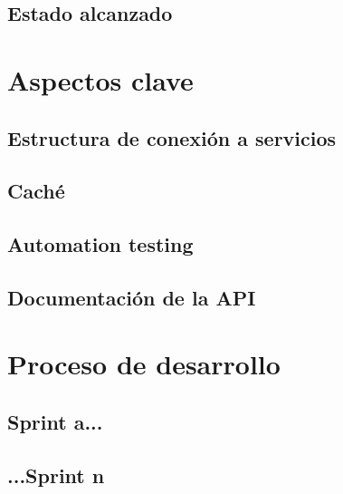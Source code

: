 \subsection{Estado alcanzado}

\section{Aspectos clave}

\subsection{Estructura de conexión a servicios}

\subsection{Caché}

\subsection{Automation testing}

\subsection{Documentación de la API}

\section{Proceso de desarrollo}

\subsection{Sprint a...}

\subsection{...Sprint n}